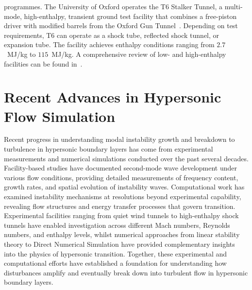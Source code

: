 programmes. The University of Oxford operates the T6 Stalker Tunnel, a multi-mode, high-enthalpy, transient ground test facility that combines a free-piston driver with modified barrels from the Oxford Gun Tunnel~\citep{CollenEtAl2021}. Depending on test requirements, T6 can operate as a shock tube, reflected shock tunnel, or expansion tube. The facility achieves enthalpy conditions ranging from $2.7$~MJ/kg to $115$~MJ/kg. A comprehensive review of low- and high-enthalpy facilities can be found in~\cite{Grossir2015}.

\section{Recent Advances in Hypersonic Flow Simulation}\label{section:introduction/recent_advances}

Recent progress in understanding modal instability growth and breakdown to turbulence in hypersonic boundary layers has come from experimental measurements and numerical simulations conducted over the past several decades. Facility-based studies have documented second-mode wave development under various flow conditions, providing detailed measurements of frequency content, growth rates, and spatial evolution of instability waves. Computational work has examined instability mechanisms at resolutions beyond experimental capability, revealing flow structures and energy transfer processes that govern transition. Experimental facilities ranging from quiet wind tunnels to high-enthalpy shock tunnels have enabled investigation across different Mach numbers, Reynolds numbers, and enthalpy levels, whilst numerical approaches from linear stability theory to Direct Numerical Simulation have provided complementary insights into the physics of hypersonic transition. Together, these experimental and computational efforts have established a foundation for understanding how disturbances amplify and eventually break down into turbulent flow in hypersonic boundary layers.


